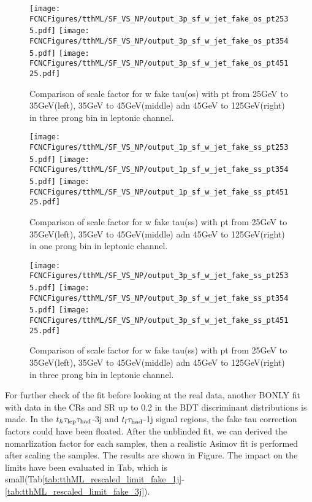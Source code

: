 \begin{figure}[H]
\centering
\texttt{[image: \\FCNCFigures/tthML/SF\_VS\_NP/output\_3p\_sf\_w\_jet\_fake\_os\_pt2535.pdf]}
\texttt{[image: \\FCNCFigures/tthML/SF\_VS\_NP/output\_3p\_sf\_w\_jet\_fake\_os\_pt3545.pdf]}
\texttt{[image: \\FCNCFigures/tthML/SF\_VS\_NP/output\_3p\_sf\_w\_jet\_fake\_os\_pt45125.pdf]}
\\
\caption{Comparison of scale factor for w fake tau(os) with pt from 25GeV to 35GeV(left), 35GeV to 45GeV(middle) adn 45GeV to 125GeV(right) in three prong bin in leptonic channel.}
\label{fig:3p_sf_b_fake_pt2535}
\end{figure}


\begin{figure}[H]
\centering
\texttt{[image: \\FCNCFigures/tthML/SF\_VS\_NP/output\_1p\_sf\_w\_jet\_fake\_ss\_pt2535.pdf]}
\texttt{[image: \\FCNCFigures/tthML/SF\_VS\_NP/output\_1p\_sf\_w\_jet\_fake\_ss\_pt3545.pdf]}
\texttt{[image: \\FCNCFigures/tthML/SF\_VS\_NP/output\_1p\_sf\_w\_jet\_fake\_ss\_pt45125.pdf]}
\\
\caption{Comparison of scale factor for w fake tau(ss) with pt from 25GeV to 35GeV(left), 35GeV to 45GeV(middle) adn 45GeV to 125GeV(right) in one prong bin in leptonic channel.}
\label{fig:1p_sf_b_fake_pt2535}
\end{figure}

\begin{figure}[H]
\centering
\texttt{[image: \\FCNCFigures/tthML/SF\_VS\_NP/output\_3p\_sf\_w\_jet\_fake\_ss\_pt2535.pdf]}
\texttt{[image: \\FCNCFigures/tthML/SF\_VS\_NP/output\_3p\_sf\_w\_jet\_fake\_ss\_pt3545.pdf]}
\texttt{[image: \\FCNCFigures/tthML/SF\_VS\_NP/output\_3p\_sf\_w\_jet\_fake\_ss\_pt45125.pdf]}
\\
\caption{Comparison of scale factor for w fake tau(ss) with pt from 25GeV to 35GeV(left), 35GeV to 45GeV(middle) adn 45GeV to 125GeV(right) in three prong bin in leptonic channel.}
\label{fig:3p_sf_b_fake_pt2535}
\end{figure}


For further check of the fit before looking at the real data, another BONLY fit with data in the CRs and SR up to 0.2 in the BDT discriminant distributions is made. In the $t_h\tau_\text{lep}{}\tau_\text{had}$-3j and $t_l\tau_\text{had}$-1j signal regions, the fake tau correction factors could have been floated. After the unblinded fit, we can derived the nomarlization factor for each samples, then a realistic Asimov fit is performed after scaling the samples. The results are shown in Figure. The impact on the limits have been evaluated in Tab, which is small(Tab\ref{tab:tthML_rescaled_limit_fake_1j}-\ref{tab:tthML_rescaled_limit_fake_3j}). 

